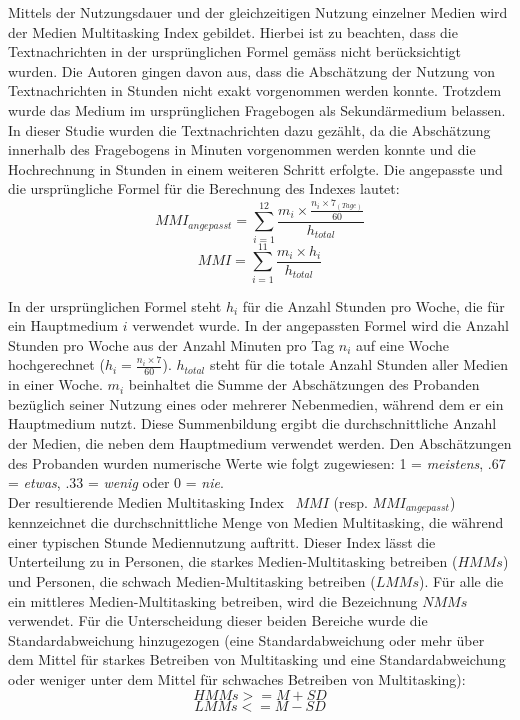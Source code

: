 Mittels der Nutzungsdauer und der gleichzeitigen Nutzung einzelner Medien wird der Medien Multitasking Index gebildet. Hierbei ist zu beachten, dass die Textnachrichten in der ursprünglichen Formel gemäss \cite{Ophir2009}  nicht berücksichtigt wurden. Die Autoren gingen davon aus, dass die Abschätzung der Nutzung von Textnachrichten in Stunden nicht exakt vorgenommen werden konnte. Trotzdem wurde das Medium im ursprünglichen Fragebogen als Sekundärmedium belassen. In dieser Studie wurden die Textnachrichten dazu gezählt, da die Abschätzung innerhalb des Fragebogens in Minuten vorgenommen werden konnte und die Hochrechnung in Stunden in einem weiteren Schritt erfolgte. Die angepasste und die ursprüngliche Formel für die Berechnung des Indexes lautet:
\begin{equation}\label{formel.mmiext}
    MMI_{angepasst}=\sum_{i=1}^{12} \frac{m_{i} \times \frac{n_{i} \times 7_{(Tage)}}{60}}{h_{total}}
\end{equation}
\begin{equation}\label{formel.mmi}
    MMI=\sum_{i=1}^{11} \frac{m_{i} \times h_{i}}{h_{total}}
\end{equation}

In der ursprünglichen Formel steht \(h_{i}\) für die Anzahl Stunden pro Woche, die für ein Hauptmedium \(i\) verwendet wurde. In der angepassten Formel wird die Anzahl Stunden pro Woche aus der Anzahl Minuten pro Tag \(n_i\) auf eine Woche hochgerechnet (\(h_{i}=\frac{n_{i} \times 7}{60}\)). \(h_{total}\) steht für die totale Anzahl Stunden aller Medien in einer Woche. \(m_i\) beinhaltet die Summe der Abschätzungen des Probanden bezüglich seiner Nutzung eines oder mehrerer Nebenmedien, während dem er ein Hauptmedium nutzt. Diese Summenbildung ergibt die durchschnittliche Anzahl der Medien, die neben dem Hauptmedium verwendet werden. Den Abschätzungen des Probanden wurden numerische Werte wie folgt zugewiesen: 1 = \textit{meistens}, .67 = \textit{etwas}, .33 = \textit{wenig} oder 0 = \textit{nie}. \\
Der resultierende Medien Multitasking Index \
$MMI$ (resp. $MMI_{angepasst}$) kennzeichnet die durchschnittliche Menge von Medien Multitasking, die während einer typischen Stunde Mediennutzung auftritt. Dieser Index lässt die Unterteilung zu in Personen, die starkes Medien-Multitasking betreiben ($HMMs$) und Personen, die schwach Medien-Multitasking betreiben ($LMMs$). Für alle die ein mittleres Medien-Multitasking betreiben, wird die Bezeichnung $NMMs$ verwendet. Für die Unterscheidung dieser beiden Bereiche wurde die Standardabweichung hinzugezogen (eine Standardabweichung oder mehr über dem Mittel für starkes Betreiben von Multitasking und eine Standardabweichung oder weniger unter dem Mittel für schwaches Betreiben von Multitasking): 
\begin{equation}\label{formel.hmms}
    HMMs>=M+SD
\end{equation}
\begin{equation}\label{formel.lmms}
    LMMs<=M-SD
\end{equation}

